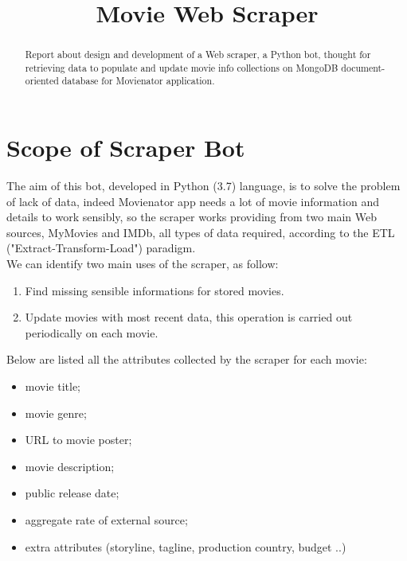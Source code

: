 \documentclass[11pt]{article}
\begin{document}
\title{Movie Web Scraper}
\date{}
\maketitle
\begin{abstract}\noindent Report about design and development of a Web scraper, a Python bot, thought for retrieving data to populate and update movie info collections on MongoDB document-oriented database for Movienator application. 

\end{abstract}



\section{Scope of Scraper Bot}
The aim of this bot, developed in Python (3.7) language, is to solve the problem of lack of data, indeed Movienator app needs a lot of movie information and details to work sensibly, so the scraper works providing from two main Web sources, MyMovies and IMDb, all types of data required, according to the ETL ("Extract-Transform-Load") paradigm.\\\newline
We can identify two main uses of the scraper, as follow:
\begin{enumerate}
    \item Find missing sensible informations for stored movies.
    \item Update movies with most recent data, this operation is carried out periodically on each movie.
\end{enumerate}
Below are listed all the attributes collected by the scraper for each movie:\newline
\begin{itemize}
    \item movie title;
    \item movie genre;
    \item URL to movie poster;
    \item movie description;
    \item public release date;
    \item aggregate rate of external source;
    \item extra attributes (storyline, tagline, production country, budget ..)
\end{itemize}
\end{document}
